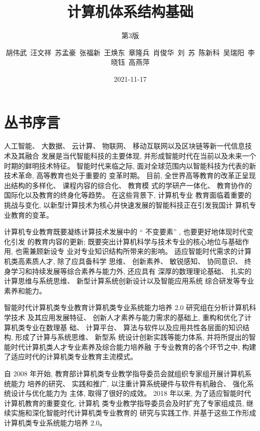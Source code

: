 \documentclass[]{ctexbook}
\title{计算机体系结构基础}
\subtitle{第3版}
\author{胡伟武~汪文祥~苏孟豪~张福新~王焕东~章隆兵~肖俊华~刘~苏~陈新科~吴瑞阳~李晓钰~高燕萍}
\date{2021-11-17}
\begin{document}
\maketitle


\thispagestyle{empty}

\setlength{\abovedisplayskip}{-5pt}
\setlength{\abovedisplayshortskip}{-5pt}

{
\setcounter{tocdepth}{2}
\tableofcontents
}
\listoftables
\listoffigures
\newpage{}

\hypertarget{ux4e1bux4e66ux5e8fux8a00}{%
\chapter*{丛书序言}\label{ux4e1bux4e66ux5e8fux8a00}}



人工智能、 大数据、 云计算、 物联网、 移动互联网以及区块链等新一代信息技术及其融合
发展是当代智能科技的主要体现, 并形成智能时代在当前以及未来一个时期的鲜明技术特征。
智能时代来临之际, 面对全球范围内以智能科技为代表的新技术革命, 高等教育也处于重要的
变革时期。 目前, 全世界高等教育的改革正呈现出结构的多样化、 课程内容的综合化、 教育模
式的学研产一体化、 教育协作的国际化以及教育的终身化等趋势。 在这些背景下, 计算机专业
教育面临着重要的挑战与变化, 以新型计算技术为核心并快速发展的智能科技正在引发我国计
算机专业教育的变革。

计算机专业教育既要凝练计算技术发展中的 `` 不变要素'' , 也要更好地体现时代变化引发
的教育内容的更新; 既要突出计算机科学与技术专业的核心地位与基础作用, 也需兼顾新设专
业对专业知识结构所带来的影响。 适应智能时代需求的计算机类高素质人才, 除了应具备科学
思维、 创新素养、 敏锐感知、 协同意识、 终身学习和持续发展等综合素养与能力外, 还应具有
深厚的数理理论基础、 扎实的计算思维与系统思维、 新型计算系统创新设计以及智能应用系统
综合研发等专业素养和能力。

智能时代计算机类专业教育计算机类专业系统能力培养 2.0 研究组在分析计算机科学技术
及其应用发展特征、 创新人才素养与能力需求的基础上, 重构和优化了计算机类专业在数理基
础、 计算平台、 算法与软件以及应用共性各层面的知识结构, 形成了计算与系统思维、 新型系
统设计创新实践等能力体系, 并将所提出的智能时代计算机类人才专业素养及综合能力培养融
于专业教育的各个环节之中, 构建了适应时代的计算机类专业教育主流模式。

自 2008 年开始, 教育部计算机类专业教学指导委员会就组织专家组开展计算机系统能力
培养的研究、 实践和推广, 以注重计算系统硬件与软件有机融合、 强化系统设计与优化能力为
主体, 取得了很好的成效。 2018 年以来, 为了适应智能时代计算机教育的重要变化, 计算机
类专业教学指导委员会及时扩充了专家组成员, 继续实施和深化智能时代计算机类专业教育的
研究与实践工作, 并基于这些工作形成计算机类专业系统能力培养 2.0。
\end{document}
